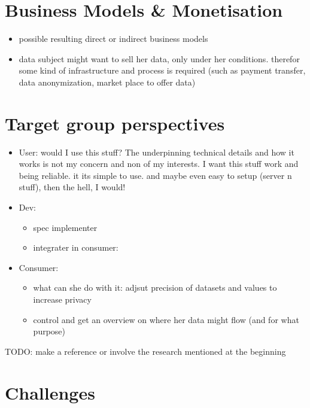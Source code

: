 \documentclass[12pt,english,a4paper,titlepage,cleardoublepage=empty,dottedtoc]{report}
\providecommand{\tightlist}{%
  \setlength{\itemsep}{0pt}\setlength{\parskip}{0pt}}
\begin{document}
\section{Business Models \&
Monetisation}\label{business-models-monetisation}

\begin{itemize}
\tightlist
\item
  possible resulting direct or indirect business models
\item
  data subject might want to sell her data, only under her conditions.
  therefor some kind of infrastructure and process is required (such as
  payment transfer, data anonymization, market place to offer data)
\end{itemize}

\section{Target group perspectives}\label{target-group-perspectives}

\begin{itemize}
\tightlist
\item
  User: would I use this stuff? The underpinning technical details and
  how it works is not my concern and non of my interests. I want this
  stuff work and being reliable. it its simple to use. and maybe even
  easy to setup (server n stuff), then the hell, I would!
\item
  Dev:

  \begin{itemize}
  \tightlist
  \item
    spec implementer
  \item
    integrater in consumer:
  \end{itemize}
\item
  Consumer:

  \begin{itemize}
  \tightlist
  \item
    what can she do with it: adjsut precision of datasets and values to
    increase privacy
  \item
    control and get an overview on where her data might flow (and for
    what purpose)
  \end{itemize}
\end{itemize}

TODO: make a reference or involve the research mentioned at the
beginning

\section{Challenges}\label{challenges}
\end{document}
